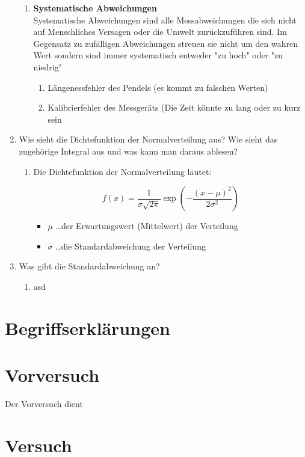 \documentclass[fleqn,10pt]{olplainarticle}
\begin{document}
\begin{enumerate}
\begin{enumerate}
        \item \textbf{Systematische Abweichungen}  \\
            Systematische Abweichungen sind alle Messabweichungen die sich nicht auf Menschliches Versagen oder die Umwelt zurückzuführen sind. Im Gegensatz zu zufälligen Abweichungen streuen sie nicht um den wahren Wert sondern sind immer systematisch entweder "zu hoch" oder "zu niedrig"  
            \begin{enumerate}
                \item Längenessfehler des Pendels (es kommt zu falschen Werten)
                \item Kalibrierfehler des Messgeräts (Die Zeit könnte zu lang oder zu kurz sein
            \end{enumerate}
    \end{enumerate}
     \item Wie sieht die Dichtefunktion der Normalverteilung aus? Wie sieht das zugehörige Integral aus und was kann man daraus ablesen? 
     \begin{enumerate}
         \item Die Dichtefunktion der Normalverteilung lautet:
                
                \[
                f(x) = \frac{1}{\sigma \sqrt{2\pi}} \exp \left( - \frac{(x - \mu)^2}{2\sigma^2} \right)
                \]
                    \begin{itemize}
        \item \( \mu \) \dots der Erwartungswert (Mittelwert) der Verteilung
        \item \( \sigma \) \dots die Standardabweichung der Verteilung 
    \end{itemize}
     \end{enumerate}
     



     \item Was gibt die Standardabweichung an?  
     \begin{enumerate}
         \item asd
     \end{enumerate}
 \end{enumerate}

\section{Begriffserklärungen}


\section{Vorversuch}
Der Vorversuch dient 

\section{Versuch}
\end{document}
